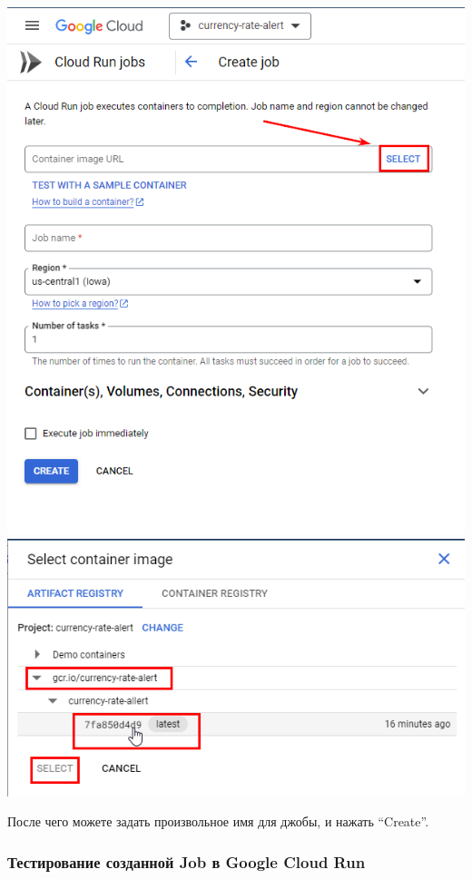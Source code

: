 \documentclass[
]{book}
\begin{document}
\includegraphics{img/9-4.png}
\includegraphics{img/9-5.png}

После чего можете задать произвольное имя для джобы, и нажать ``Create''.

\subsubsection{Тестирование созданной Job в Google Cloud Run}\label{ux442ux435ux441ux442ux438ux440ux43eux432ux430ux43dux438ux435-ux441ux43eux437ux434ux430ux43dux43dux43eux439-job-ux432-google-cloud-run}
\end{document}
